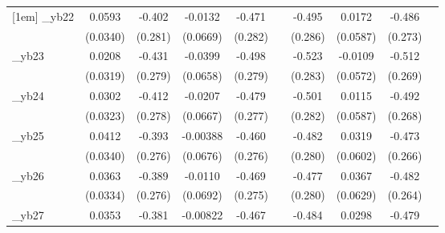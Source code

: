 \begin{table}[htbp]
\begin{tabular}{l*{9}{c}}
[1em]
\_yb22       &      0.0593\sym{*}  &      -0.402         &     -0.0132         &      -0.471\sym{*}  &                     &      -0.495\sym{*}  &      0.0172         &      -0.486\sym{*}  &                     \\
            &    (0.0340)         &     (0.281)         &    (0.0669)         &     (0.282)         &                     &     (0.286)         &    (0.0587)         &     (0.273)         &                     \\
[1em]
\_yb23       &      0.0208         &      -0.431         &     -0.0399         &      -0.498\sym{*}  &                     &      -0.523\sym{*}  &     -0.0109         &      -0.512\sym{*}  &                     \\
            &    (0.0319)         &     (0.279)         &    (0.0658)         &     (0.279)         &                     &     (0.283)         &    (0.0572)         &     (0.269)         &                     \\
[1em]
\_yb24       &      0.0302         &      -0.412         &     -0.0207         &      -0.479\sym{*}  &                     &      -0.501\sym{*}  &      0.0115         &      -0.492\sym{*}  &                     \\
            &    (0.0323)         &     (0.278)         &    (0.0667)         &     (0.277)         &                     &     (0.282)         &    (0.0587)         &     (0.268)         &                     \\
[1em]
\_yb25       &      0.0412         &      -0.393         &    -0.00388         &      -0.460\sym{*}  &                     &      -0.482\sym{*}  &      0.0319         &      -0.473\sym{*}  &                     \\
            &    (0.0340)         &     (0.276)         &    (0.0676)         &     (0.276)         &                     &     (0.280)         &    (0.0602)         &     (0.266)         &                     \\
[1em]
\_yb26       &      0.0363         &      -0.389         &     -0.0110         &      -0.469\sym{*}  &                     &      -0.477\sym{*}  &      0.0367         &      -0.482\sym{*}  &                     \\
            &    (0.0334)         &     (0.276)         &    (0.0692)         &     (0.275)         &                     &     (0.280)         &    (0.0629)         &     (0.264)         &                     \\
[1em]
\_yb27       &      0.0353         &      -0.381         &    -0.00822         &      -0.467\sym{*}  &                     &      -0.484\sym{*}  &      0.0298         &      -0.479\sym{*}  &                     \\

\end{tabular}
\end{table}
